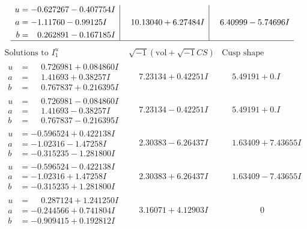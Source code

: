 \documentclass[1p]{elsarticle_modified}
\theoremstyle{definition}
\newcommand{\I}{\sqrt{-1}}
\begin{document}
$$\begin{array}{c|c|c}
\begin{aligned}
u &= -0.627267 - 0.407754 I \\
a &= -1.11760 - 0.99125 I \\
b &= \phantom{-}0.262891 - 0.167185 I\end{aligned}
 & \phantom{-}10.13040 + 6.27484 I & \phantom{-}6.40999 - 5.74696 I\\
 \hline 
 \end{array}$$\newpage$$\begin{array}{c|c|c}  
\text{Solutions to }I^u_{1}& \I (\text{vol} + \sqrt{-1}CS) & \text{Cusp shape}\\
 \hline 
\begin{aligned}
u &= \phantom{-}0.726981 + 0.084860 I \\
a &= \phantom{-}1.41693 + 0.38257 I \\
b &= \phantom{-}0.767837 + 0.216395 I\end{aligned}
 & \phantom{-}7.23134 + 0.42251 I & \phantom{-}5.49191 + 0. I\phantom{ +0.000000I} \\ \hline\begin{aligned}
u &= \phantom{-}0.726981 - 0.084860 I \\
a &= \phantom{-}1.41693 - 0.38257 I \\
b &= \phantom{-}0.767837 - 0.216395 I\end{aligned}
 & \phantom{-}7.23134 - 0.42251 I & \phantom{-}5.49191 + 0. I\phantom{ +0.000000I} \\ \hline\begin{aligned}
u &= -0.596524 + 0.422138 I \\
a &= -1.02316 - 1.47258 I \\
b &= -0.315235 - 1.281800 I\end{aligned}
 & \phantom{-}2.30383 - 6.26437 I & \phantom{-}1.63409 + 7.43655 I \\ \hline\begin{aligned}
u &= -0.596524 - 0.422138 I \\
a &= -1.02316 + 1.47258 I \\
b &= -0.315235 + 1.281800 I\end{aligned}
 & \phantom{-}2.30383 + 6.26437 I & \phantom{-}1.63409 - 7.43655 I \\ \hline\begin{aligned}
u &= \phantom{-}0.287124 + 1.241250 I \\
a &= -0.244566 + 0.741804 I \\
b &= -0.909415 + 0.192812 I\end{aligned}
 & \phantom{-}3.16071 + 4.12903 I & \phantom{-0.000000 } 0 \\ \hline\begin{aligned}

\end{aligned}
\end{array}$$
\end{document}
